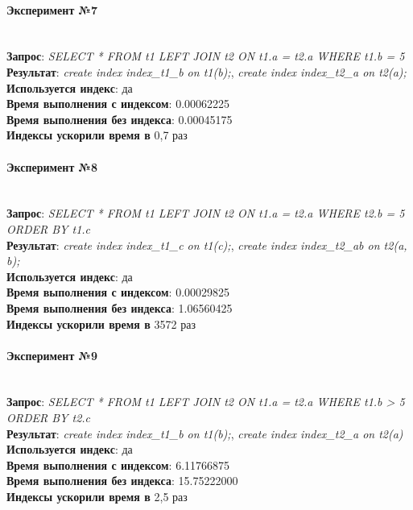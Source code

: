 \paragraph{Эксперимент №7}\\
\textbf{Запрос}: \textit{SELECT * FROM t1 LEFT JOIN t2 ON t1.a = t2.a WHERE t1.b = 5}\\
\textbf{Результат}: \textit{create index index_t1_b on t1(b);}, \textit{create index index_t2_a on t2(a);}\\
\textbf{Используется индекс}: да\\
\textbf{Время выполнения с индексом}: 0.00062225\\
\textbf{Время выполнения без индекса}: 0.00045175\\
\textbf{Индексы ускорили время в} 0,7 раз\\

\paragraph{Эксперимент №8}\\
\textbf{Запрос}: \textit{SELECT * FROM t1 LEFT JOIN t2 ON t1.a = t2.a WHERE t2.b = 5 ORDER BY t1.c}\\
\textbf{Результат}: \textit{create index index_t1_c on t1(c);}, \textit{create index index_t2_ab on t2(a, b);}\\
\textbf{Используется индекс}: да\\
\textbf{Время выполнения с индексом}: 0.00029825\\
\textbf{Время выполнения без индекса}: 1.06560425\\
\textbf{Индексы ускорили время в} 3572 раз\\

\paragraph{Эксперимент №9}\\
\textbf{Запрос}: \textit{SELECT * FROM t1 LEFT JOIN t2 ON t1.a = t2.a WHERE t1.b > 5 ORDER BY t2.c}\\
\textbf{Результат}: \textit{create index index_t1_b on t1(b);}, \textit{create index index_t2_a on t2(a)}\\
\textbf{Используется индекс}: да\\
\textbf{Время выполнения с индексом}: 6.11766875\\
\textbf{Время выполнения без индекса}: 15.75222000\\
\textbf{Индексы ускорили время в} 2,5 раз\\

